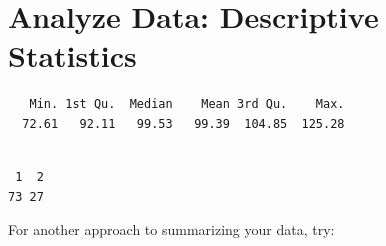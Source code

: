 \documentclass[
  letterpaper,
  DIV=11,
  numbers=noendperiod]{scrartcl}
\newenvironment{Shaded}{\begin{snugshade}}{\end{snugshade}}
\newcommand{\CommentTok}[1]{\textcolor[rgb]{0.37,0.37,0.37}{#1}}
\newcommand{\FunctionTok}[1]{\textcolor[rgb]{0.28,0.35,0.67}{#1}}
\newcommand{\NormalTok}[1]{\textcolor[rgb]{0.00,0.23,0.31}{#1}}
\newcommand{\SpecialCharTok}[1]{\textcolor[rgb]{0.37,0.37,0.37}{#1}}
\begin{document}
\hypertarget{analyze-data-descriptive-statistics}{%
\section{Analyze Data: Descriptive
Statistics}\label{analyze-data-descriptive-statistics}}

\begin{Shaded}
\end{Shaded}

\begin{verbatim}
   Min. 1st Qu.  Median    Mean 3rd Qu.    Max. 
  72.61   92.11   99.53   99.39  104.85  125.28 
\end{verbatim}

\begin{Shaded}
\end{Shaded}

\begin{verbatim}

 1  2 
73 27 
\end{verbatim}

For another approach to summarizing your data, try:

\begin{Shaded}
\end{Shaded}
\end{document}
